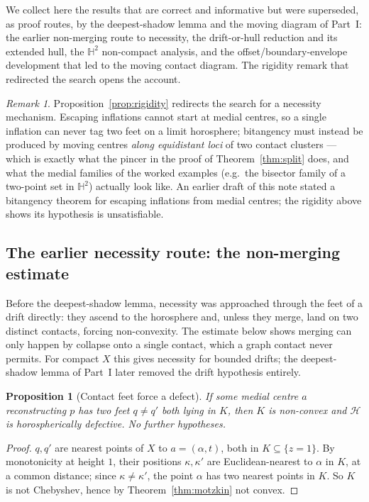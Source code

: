 \documentclass[11pt]{article}
\newtheorem{proposition}[theorem]{Proposition}
\theoremstyle{remark}
\newtheorem{remark}[theorem]{Remark}
\newcommand{\X}{X}
\newcommand{\Hb}[1]{\mathcal{H}_{#1}}
\begin{document}
We collect here the results that are correct and
informative but were superseded, as proof routes, by the deepest-shadow
lemma and the moving diagram of Part~I: the earlier non-merging route to
necessity, the drift-or-hull reduction and its extended hull, the
$\mathbb{H}^{2}$ non-compact analysis, and the offset/boundary-envelope
development that led to the moving contact diagram. The rigidity remark
that redirected the search opens the account.

\begin{remark}\label{rem:vacuity}
Proposition~\ref{prop:rigidity} redirects the search for a necessity
mechanism. Escaping inflations cannot start at medial centres, so a
single inflation can never tag two feet on a limit horosphere;
bitangency must instead be produced by moving centres \emph{along
equidistant loci} of two contact clusters --- which is exactly what
the pincer in the proof of Theorem~\ref{thm:split} does, and what the
medial families of the worked examples (e.g.\ the bisector family of
a two-point set in $\mathbb{H}^{2}$) actually look like. An earlier
draft of this note stated a bitangency theorem for escaping
inflations from medial centres; the rigidity above shows its
hypothesis is unsatisfiable.
\end{remark}

\subsection{The earlier necessity route: the
non-merging estimate}\label{sec:hnec}
Before the deepest-shadow lemma, necessity was approached through the
feet of a drift directly: they ascend to the horosphere and, unless they
merge, land on two distinct contacts, forcing non-convexity. The estimate
below shows merging can only happen by collapse onto a single contact,
which a graph contact never permits. For compact $\X$ this gives
necessity for bounded drifts; the deepest-shadow lemma of Part~I later
removed the drift hypothesis entirely.

\begin{proposition}[Contact feet force a defect]\label{prop:contactfeet}
If some medial centre $a$ reconstructing $p$ has two feet
$q\neq q'$ both lying in $K$, then $K$ is non-convex and $\Hb{}$ is
horospherically defective. No further hypotheses.
\end{proposition}

\begin{proof}
$q,q'$ are nearest points of $\X$ to $a=(\alpha,t)$, both in
$K\subseteq\{z=1\}$. By monotonicity at height $1$, their positions
$\kappa,\kappa'$ are Euclidean-nearest to $\alpha$ in $K$, at a common
distance; since $\kappa\neq\kappa'$, the point $\alpha$ has two nearest
points in $K$. So $K$ is not Chebyshev, hence by
Theorem~\ref{thm:motzkin} not convex.
\end{proof}
\end{document}
